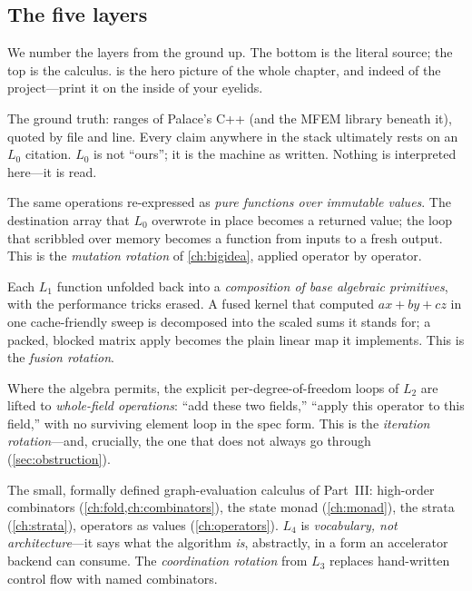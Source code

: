 \subsection{The five layers}

We number the layers from the ground up. The bottom is the literal source; the
top is the calculus.  is the hero picture of the whole chapter,
and indeed of the project---print it on the inside of your eyelids.

\begin{description}[leftmargin=2.2em,style=nextline]
  \item[$L_0$ --- the cited source.] The ground truth: ranges of Palace's
  C++ (and the MFEM library beneath it), quoted by file and line. Every claim
  anywhere in the stack ultimately rests on an $L_0$ citation. $L_0$ is not
  ``ours''; it is the machine as written. Nothing is interpreted here---it is read.

  \item[$L_1$ --- pure functions.] The same operations re-expressed as
  \emph{pure functions over immutable values}. The destination array that $L_0$
  overwrote in place becomes a returned value; the loop that scribbled over memory
  becomes a function from inputs to a fresh output. This is the
  \emph{mutation rotation} of \cref{ch:bigidea}, applied operator by operator.

  \item[$L_2$ --- algebraic decompositions.] Each $L_1$ function unfolded back
  into a \emph{composition of base algebraic primitives}, with the performance
  tricks erased. A fused kernel that computed $a x + b y + c z$ in one
  cache-friendly sweep is decomposed into the scaled sums it stands for; a
  packed, blocked matrix apply becomes the plain linear map it implements. This is
  the \emph{fusion rotation}.

  \item[$L_3$ --- global tensor-field operations.] Where the algebra permits,
  the explicit per-degree-of-freedom loops of $L_2$ are lifted to
  \emph{whole-field operations}: ``add these two fields,'' ``apply this operator
  to this field,'' with no surviving element loop in the spec form. This is the
  \emph{iteration rotation}---and, crucially, the one that does not always go
  through (\cref{sec:obstruction}).

  \item[$L_4$ --- the calculus.] The small, formally defined
  graph-evaluation calculus of Part~III: high-order combinators
  (\cref{ch:fold,ch:combinators}), the state monad (\cref{ch:monad}), the strata
  (\cref{ch:strata}), operators as values (\cref{ch:operators}). $L_4$ is
  \emph{vocabulary, not architecture}---it says what the algorithm \emph{is},
  abstractly, in a form an accelerator backend can consume. The
  \emph{coordination rotation} from $L_3$ replaces hand-written control flow with
  named combinators.
\end{description}

